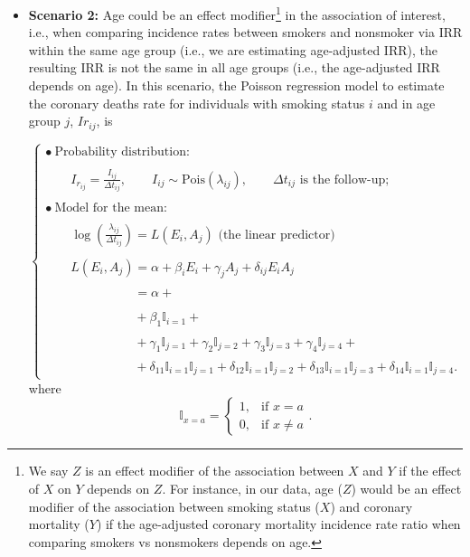 \documentclass[a4paper,10pt]{article}\usepackage[]{graphicx}\usepackage[]{xcolor}
\newcommand{\I}{\mathbb{I}}   %
\begin{document}
\begin{itemize}
    
    
  \item \textbf{Scenario 2:} Age could be an effect modifier\footnote{We say $Z$ is an effect modifier of the association between $X$ and $Y$ if the effect of $X$ on $Y$ depends on $Z$. For instance, in our data, age ($Z$) would be an effect modifier of the association between smoking status ($X$) and coronary mortality ($Y$) if the age-adjusted coronary mortality incidence rate ratio when comparing smokers vs nonsmokers depends on age.} in the association of interest, i.e., when comparing incidence rates between smokers and nonsmoker via IRR within the same age group (i.e., we are estimating age-adjusted IRR), the resulting IRR is not the same in all age groups (i.e., the age-adjusted IRR depends on age). In this scenario, the Poisson regression model to estimate the coronary deaths rate for individuals with smoking status $i$ and in age group $j$, $Ir_{ij}$, is

  

\begin{equation}
\label{eq:modelinter}
\left\{
\begin{array}{l}
\bullet\ \text{Probability distribution:} \\ \\
\qquad
I_{r_{ij}}
=
\frac{I_{ij}}{\Delta t_{ij}},
\qquad
I_{ij} \sim  \text{Pois}(\lambda_{ij}),
\qquad
\Delta t_{ij}\text{ is the follow-up;}\\ \\
\bullet\ \text{Model for the mean:} \\ \\
\qquad
\log
\left(
\frac{\lambda_{ij}}{\Delta t_{ij}}
\right)
=
L(E_i, A_j) \text{ (the linear predictor)}\\ \\
\qquad
L(E_i, A_j)
 = 
\alpha + \beta_i E_i + \gamma_j A_j + \delta_{ij} E_i A_j\\
\phantom{
\qquad
L(E_i, A_j)
}
 = 
\alpha + \\
\phantom{
\qquad
L(E_i, A_j)
} + \beta_1 \I_{i=1} + \\
\phantom{
\qquad
L(E_i, A_j)
} + 
\gamma_1 \I_{j=1} +
\gamma_2 \I_{j=2} +
\gamma_3 \I_{j=3} +
\gamma_4 \I_{j=4} +\\
\phantom{
\qquad
L(E_i, A_j)
} + 
\delta_{11} \I_{i=1}\I_{j=1} +
\delta_{12} \I_{i=1}\I_{j=2} +
\delta_{13} \I_{i=1}\I_{j=3} +
\delta_{14} \I_{i=1}\I_{j=4}.
\end{array}
\right.
\end{equation}
where
\begin{equation*}
\I_{x=a}
=
\left\{
\begin{array}{ll}
1, & \text{if } x = a \\
0, & \text{if } x \neq a
\end{array}
\right..
\end{equation*}



\end{itemize}
\end{document}
